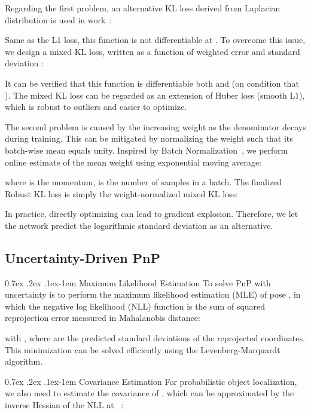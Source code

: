 \documentclass[10pt,twocolumn,letterpaper]{article}
\makeatletter
\renewcommand{\paragraph}{
  \@startsection{paragraph}{4}
  {\z@}{0.7ex \@plus .2ex \@minus .1ex}{-1em}
  {\normalfont\normalsize\bfseries}
}
\makeatother
\begin{document}
Regarding the first problem, an alternative KL loss derived from Laplacian distribution is used in work~\cite{monopair, kendall2017uncertainties}:

Same as the L1 loss, this function is not differentiable at . To overcome this issue, we design a mixed KL loss, written as a function of weighted error  and standard deviation :

It can be verified that this function is differentiable \wrt both  and  (on condition that ).
The mixed KL loss can be regarded as an extension of Huber loss (smooth L1), which is robust to outliers and easier to optimize.

The second problem is caused by the increasing weight  as the denominator  decays during training. This can be mitigated by normalizing the weight such that its batch-wise mean equals unity. Inspired by Batch Normalization~\cite{batchnorm}, we perform online estimate of the mean weight  using exponential moving average:

where  is the momentum,  is the number of samples in a batch. The finalized Robust KL loss is simply the weight-normalized mixed KL loss:


In practice, directly optimizing  can lead to gradient explosion. Therefore, we let the network predict the logarithmic standard deviation  as an alternative.

\subsection{Uncertainty-Driven PnP}
\paragraph{Maximum Likelihood Estimation}
To solve PnP with uncertainty is to perform the maximum likelihood estimation (MLE) of pose , in which the negative log likelihood (NLL) function is the sum of squared reprojection error  measured in Mahalanobis distance:

with , where  are the predicted standard deviations of the reprojected coordinates. This minimization can be solved efficiently using the Levenberg-Marquardt algorithm.

\paragraph{Covariance Estimation}
For probabilistic object localization, we also need to estimate the covariance of , which can be approximated by the inverse Hessian of the NLL at ~\cite{likelihood}:
\end{document}
